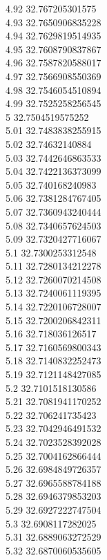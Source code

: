 {4.92	32.767205301575\\
4.93	32.7650906835228\\
4.94	32.7629819514935\\
4.95	32.7608790837867\\
4.96	32.7587820588017\\
4.97	32.7566908550369\\
4.98	32.7546054510894\\
4.99	32.7525258256545\\
5	32.7504519575252\\
5.01	32.7483838255915\\
5.02	32.74632140884\\
5.03	32.7442646863533\\
5.04	32.7422136373099\\
5.05	32.740168240983\\
5.06	32.7381284767405\\
5.07	32.7360943240444\\
5.08	32.7340657624503\\
5.09	32.7320427716067\\
5.1	32.7300253312548\\
5.11	32.7280134212278\\
5.12	32.7260070214508\\
5.13	32.7240061119395\\
5.14	32.7220106728007\\
5.15	32.7200206842311\\
5.16	32.718036126517\\
5.17	32.7160569800343\\
5.18	32.7140832252473\\
5.19	32.7121148427085\\
5.2	32.7101518130586\\
5.21	32.7081941170252\\
5.22	32.706241735423\\
5.23	32.7042946491532\\
5.24	32.7023528392028\\
5.25	32.7004162866444\\
5.26	32.6984849726357\\
5.27	32.6965588784188\\
5.28	32.6946379853203\\
5.29	32.6927222747504\\
5.3	32.6908117282025\\
5.31	32.6889063272529\\
5.32	32.6870060535605\\
}
